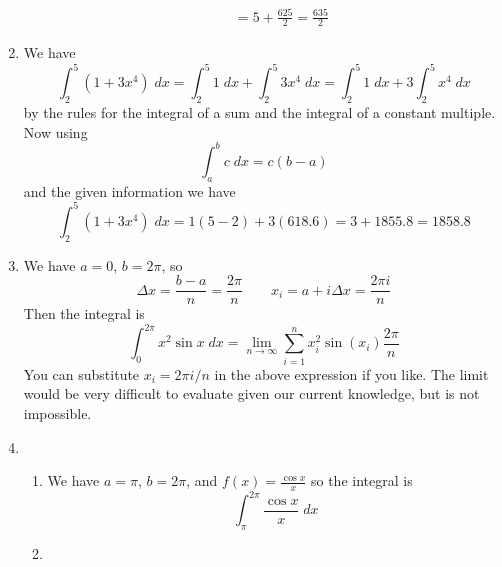 \documentclass{article}
\newcommand{\ds}{\displaystyle}
\begin{document}
\begin{enumerate}
\begin{enumerate}
\begin{align*}
      &= 5 + \frac{625}{2} = \frac{635}{2}
    \end{align*}
  \end{enumerate}
\item %
  We have
  \begin{equation*}
    \int_2^5 (1+3x^4) \; dx = \int_2^5 1 \; dx + \int_2^5 3x^4 \; dx
    = \int_2^5 1 \; dx + 3\int_2^5 x^4 \; dx
  \end{equation*}
  by the rules for the integral of a sum and the integral of a
  constant multiple.  Now using
  \begin{equation*}
    \int_a^b c \; dx = c(b-a)
  \end{equation*}
  and the given information we have
  \begin{equation*}
    \int_2^5 (1+3x^4) \; dx = 1(5-2) + 3(618.6) = 3 + 1855.8 = 1858.8
  \end{equation*}
\item %
  We have $a=0$, $b=2\pi$, so
  \begin{equation*}
    \Delta x = \frac{b-a}{n} = \frac{2\pi}{n}
    \qquad
    x_i = a + i \Delta x = \frac{2\pi i}{n}
  \end{equation*}
  Then the integral is
  \begin{equation*}
    \int_0^{2\pi} x^2 \sin x \; dx
    = \lim_{n\to\infty} \sum_{i=1}^n x_i^2 \sin(x_i) \frac{2\pi}{n}
  \end{equation*}
  You can substitute $x_i = 2\pi i/n$ in the above expression if you
  like.  The limit would be very difficult to evaluate given our
  current knowledge, but is not impossible.
\item %
  \begin{enumerate}
  \item %
    We have $a=\pi$, $b=2\pi$, and $\ds f(x) = \frac{\cos x}{x}$ so
    the integral is
    \begin{equation*}
      \int_{\pi}^{2\pi} \frac{\cos x}{x} \; dx
    \end{equation*}
  \item %

\end{enumerate}
\end{enumerate}
\end{document}
